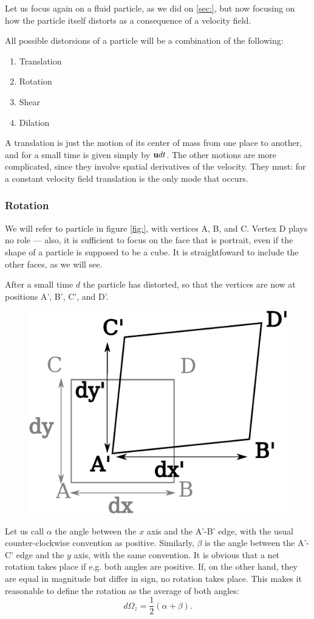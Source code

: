 \label{sec:particle}

Let us focus again on a fluid particle, as we did on \ref{sec:}, but
now focusing on how the particle itself distorts as a consequence of a
velocity field.

All possible distorsions of a particle will be a combination of the
following:
\begin{enumerate}
 \item Translation
 \item Rotation
 \item Shear
 \item Dilation
\end{enumerate}

A translation is just the motion of its center of mass from one place
to another, and for a small time is given simply by $\mathbf{u} dt$. The
other motions are more complicated, since they involve spatial
derivatives of the velocity. They must: for a constant velocity field
translation is the only mode that occurs.

\subsubsection{Rotation}

We will refer to particle in figure \ref{fig:}, with vertices A, B,
and C. Vertex D plays no role --- also, it is sufficient to focus on
the face that is portrait, even if the shape of a particle is supposed
to be a cube. It is straightfoward to include the other faces, as we
will see.

After a small time $d$ the particle has distorted, so that the
vertices are now at positions A', B', C', and D'.

\begin{figure}
  \centering
  \includegraphics[width=0.4\linewidth]{figures/particle0}
  \caption{\label{fig:particle0}}
\end{figure}



Let us call $\alpha$ the angle between the $x$ axis and the A'-B'
edge, with the usual counter-clockwise convention as
positive. Similarly, $\beta$ is the angle between the A'-C' edge and
the $y$ axis, with the same convention. It is obvious that a net
rotation takes place if e.g. both angles are positive. If, on the
other hand, they are equal in magnitude but differ in sign, no
rotation takes place. This makes it reasonable to define the
rotation as the average of both angles:
\[
d\Omega_z = \frac12
\left(
        \alpha + \beta
\right) .
\]

